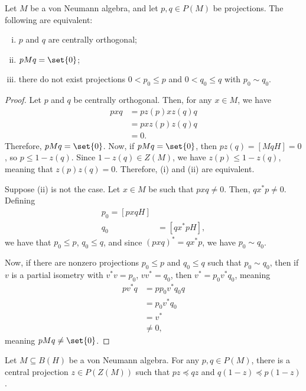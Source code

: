 \documentclass[10pt]{mypackage}
\begin{document}
\begin{proposition}
  Let $M$ be a von Neumann algebra, and let $p,q\in P(M)$ be projections. The following are equivalent:
  \begin{enumerate}[(i)]
    \item $p$ and $q$ are centrally orthogonal;
    \item $pMq = \set{0}$;
    \item there do not exist projections $0 < p_0 \leq p$ and $0 < q_0\leq q$ with $p_0\sim q_0$.
  \end{enumerate}
\end{proposition}
\begin{proof}
  Let $p$ and $q$ be centrally orthogonal. Then, for any $x\in M$, we have
  \begin{align*}
    pxq &= pz(p)xz(q)q\\
        &= pxz(p)z(q)q\\
        &= 0.
  \end{align*}
  Therefore, $pMq = \set{0}$. Now, if $pMq = \set{0}$, then $pz(q) = \left[ MqH \right] = 0$, so $p \leq 1-z(q)$. Since $1-z(q)\in Z(M)$, we have $z(p) \leq 1-z(q)$, meaning that $z(p)z(q) = 0$. Therefore, (i) and (ii) are equivalent.

  Suppose (ii) is not the case. Let $x\in M$ be such that $pxq\neq 0$. Then, $qx^{\ast}p \neq 0$. Defining
  \begin{align*}
    p_0 = \left[ pxqH \right]\\
    q_0 &= \left[ qx^{\ast}pH \right],
  \end{align*}
  we have that $p_0\leq p$, $q_0\leq q$, and since $\left( pxq \right)^{\ast} = qx^{\ast}p$, we have $p_0\sim q_0$.

  Now, if there are nonzero projections $p_0\leq p$ and $q_0 \leq q$ such that $p_0\sim q_0$, then if $v$ is a partial isometry with $v^{\ast}v = p_0$, $vv^{\ast} = q_0$, then $v^{\ast} = p_0 v^{\ast}q_0$, meaning
  \begin{align*}
    pv^{\ast}q &= pp_0v^{\ast}q_0q\\
               &= p_0v^{\ast}q_0\\
               &= v^{\ast}\\
               &\neq 0,
  \end{align*}
  meaning $pMq \neq \set{0}$.
\end{proof}
\begin{theorem}
  Let $M\subseteq B(H)$ be a von Neumann algebra. For any $p,q\in P(M)$, there is a central projection $z\in P(Z(M))$ such that $pz\preceq qz$ and $q\left( 1-z \right)\preceq p\left( 1-z \right)$.
\end{theorem}
\end{document}
